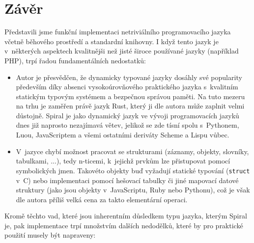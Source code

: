\chapter{Závěr}

Představili jsme funkční implementaci netriviálního programovacího jazyka včetně
běhového prostředí a standardní knihovny. I když tento jazyk je v~některých
aspektech kvalitnějši než jisté široce používané jazyky (například 
PHP), trpí řadou fundamentálních nedostatků:

\begin{itemize}
  \item Autor je přesvědčen, že dynamicky typované jazyky dosáhly své popularity
    především díky absenci vysokoúrovňového praktického jazyka s~kvalitním
    statickým typovým systémem a bezpečnou správou paměti. Na tuto mezeru na
    trhu je zaměřen právě jazyk Rust, který ji dle autora může zaplnit velmi
    důstojně. Spiral je jako dynamický jazyk ve vývoji programovacích jazyků
    dnes již naprosto nezajímavá větev, jelikož se zde tísní spolu s~Pythonem,
    Luou, JavaScriptem a všemi ostatními deriváty Scheme a Lispu vůbec.

  \item V~jazyce chybí možnost pracovat se strukturami (záznamy, objekty,
    slovníky, tabulkami, ...), tedy n-ticemi, k~jejichž prvkům lze přistupovat
    pomocí symbolických jmen. Takovéto objekty buď vyžadují statické typování
    (\texttt{struct} v~C) nebo implementaci pomocí hešovací tabulky či jiné
    mapovací datové struktury (jako jsou objekty v~JavaScriptu, Ruby nebo
    Pythonu), což je však dle autora příliš velká cena za takto elementární
    operaci.
\end{itemize}

Kromě těchto vad, které jsou inherentním důsledkem typu jazyka, kterým Spiral
je, pak implementace trpí množstvím dalších nedodělků, které by pro praktické
použití musely být napraveny:

